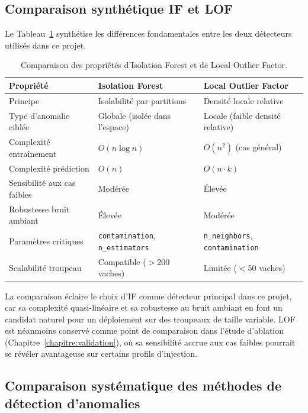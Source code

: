 \subsection{Comparaison synthétique IF et LOF}
Le Tableau~\ref{tab:if_vs_lof} synthétise les différences fondamentales entre les deux
détecteurs utilisés dans ce projet.

\begin{table}[H]
    \centering
    \caption{Comparaison des propriétés d'Isolation Forest et de Local Outlier Factor.}
    \label{tab:if_vs_lof}
    \begin{tabular}{lll}
        \toprule
        \textbf{Propriété}            & \textbf{Isolation Forest}
            & \textbf{Local Outlier Factor} \\
        \midrule
        Principe                      & Isolabilité par partitions
            & Densité locale relative \\
        Type d'anomalie ciblée        & Globale (isolée dans l'espace)
            & Locale (faible densité relative) \\
        Complexité entraînement       & $O(n \log n)$
            & $O(n^2)$ (cas général) \\
        Complexité prédiction         & $O(n)$
            & $O(n \cdot k)$ \\
        Sensibilité aux cas faibles   & Modérée
            & Élevée \\
        Robustesse bruit ambiant      & Élevée
            & Modérée \\
        Paramètres critiques          & \texttt{contamination}, \texttt{n\_estimators}
            & \texttt{n\_neighbors}, \texttt{contamination} \\
        Scalabilité troupeau          & Compatible ($>$200 vaches)
            & Limitée ($<$50 vaches) \\
        \bottomrule
    \end{tabular}
\end{table}

La comparaison éclaire le choix d'IF comme détecteur principal dans ce projet, car sa
complexité quasi-linéaire et sa robustesse au bruit ambiant en font un candidat naturel
pour un déploiement sur des troupeaux de taille variable. LOF est néanmoins conservé comme point de
comparaison dans l'étude d'ablation (Chapitre~\ref{chapitre:validation}), où sa sensibilité
accrue aux cas faibles pourrait se révéler avantageuse sur certains profils d'injection.

\subsection{Comparaison systématique des méthodes de détection d'anomalies}

